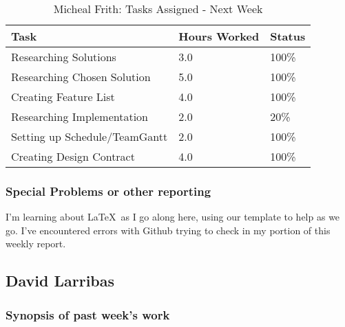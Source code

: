 \documentclass[12pt,article,compsoc]{IEEEtran}
\begin{document}
	\begin{table}[ht]
	\renewcommand{\arraystretch}{1.3}
		\caption{Micheal Frith: Tasks Assigned - Next Week}
		
		\label{Summary of Micheal Frith's activities: this week}
		
		\centering
		\begin{tabular}{p{5.5cm}|p{1cm}|p{1cm}}
		\hline
		\bfseries 	Task		 							& \bfseries Hours Worked	& \bfseries Status	\\
		\hline\hline
					Researching Solutions					& 3.0						& 100\%				\\	%
					Researching Chosen Solution				& 5.0						& 100\%				\\
					Creating Feature List					& 4.0						& 100\%				\\	%
					Researching Implementation				& 2.0						& 20\%				\\
					Setting up Schedule/TeamGantt			& 2.0						& 100\%				\\	%
					Creating Design Contract				& 4.0						& 100\%				\\
		\hline
		\end{tabular}
	\end{table}

	\subsubsection*{Special Problems or other reporting}
	I'm learning about \LaTeX \ as I go along here, using our template to help as we go. I've encountered errors 
	with Github trying to check in my portion of this weekly report.
	 

\subsection{David Larribas}

	\subsubsection*{Synopsis of past week's work}
\end{document}
